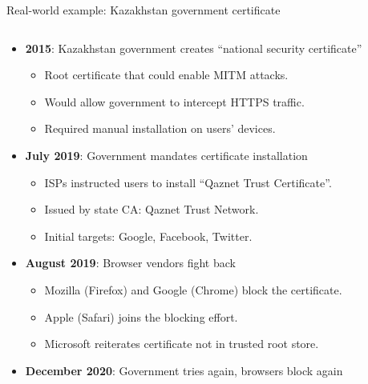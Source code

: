 \documentclass[aspectratio=169, lualatex, handout]{beamer}
\begin{document}
\begin{frame}{Real-world example: Kazakhstan government certificate}
	\begin{columns}[c]
		\begin{column}{0.8\textwidth}
			\begin{itemize}[<+->]
				\item \textbf{2015}: Kazakhstan government creates ``national security certificate''
				      \begin{itemize}
					      \item Root certificate that could enable MITM attacks.
					      \item Would allow government to intercept HTTPS traffic.
					      \item Required manual installation on users' devices.
				      \end{itemize}
				\item \textbf{July 2019}: Government mandates certificate installation
				      \begin{itemize}
					      \item ISPs instructed users to install ``Qaznet Trust Certificate''.
					      \item Issued by state CA: Qaznet Trust Network.
					      \item Initial targets: Google, Facebook, Twitter.
				      \end{itemize}
				\item \textbf{August 2019}: Browser vendors fight back
				      \begin{itemize}
					      \item Mozilla (Firefox) and Google (Chrome) block the certificate.
					      \item Apple (Safari) joins the blocking effort.
					      \item Microsoft reiterates certificate not in trusted root store.
				      \end{itemize}
				\item \textbf{December 2020}: Government tries again, browsers block again
			\end{itemize}
		\end{column}
		\begin{column}{0.2\textwidth}
		\end{column}
	\end{columns}
\end{frame}
\end{document}
